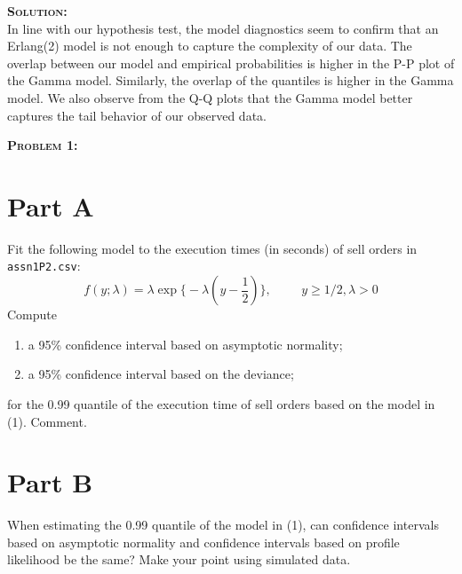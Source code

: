 \documentclass[12pt,oneside]{article}
\newenvironment{problem}[1]
{\begin{mdframed}
        \textbf{\textsc{Problem #1:}}
}
{\end{mdframed}}
\newenvironment{solution}
    {\textbf{\textsc{Solution:}}\\}
    {\newpage}
\begin{document}
\begin{solution}
In line with our hypothesis test, the model diagnostics seem to confirm that an Erlang(2) model is not enough to capture the complexity of our data. The overlap between our model  and empirical probabilities is higher in the P-P plot of the Gamma model. Similarly, the overlap of the quantiles is  higher in the Gamma model. We also observe from the Q-Q plots that the Gamma model better captures the tail behavior of our observed data.
\end{solution}

\begin{problem}{1}
\section*{Part A}
Fit the following model to the execution times (in seconds) of sell orders in \texttt{assn1P2.csv}:
\[f(y; \lambda) = \lambda \exp\bigg\{-\lambda(y - \frac{1}{2})\bigg\},\hspace{1cm} y \geq 1/2, \lambda > 0\tag{1}\]
Compute
\begin{enumerate}
    \item a 95\% confidence interval based on asymptotic normality;
    \item a 95\% confidence interval based on the deviance;
\end{enumerate}

for the 0.99 quantile of the execution time of sell orders based on the model in (1). Comment.

\section*{Part B}
When estimating the 0.99 quantile of the model in (1), can confidence intervals based on
asymptotic normality and confidence intervals based on profile likelihood be the same? Make
your point using simulated data.
\end{problem}
\end{document}
